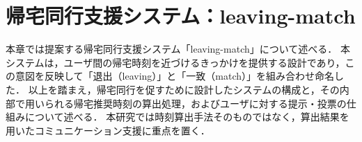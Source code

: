\thispagestyle{myheadings}
\chapter{帰宅同行支援システム：leaving-match}
本章では提案する帰宅同行支援システム「leaving-match」について述べる．
本システムは，ユーザ間の帰宅時刻を近づけるきっかけを提供する設計であり，この意図を反映して「退出（leaving）」と「一致（match）」を組み合わせ命名した．
以上を踏まえ，帰宅同行を促すために設計したシステムの構成と，その内部で用いられる帰宅推奨時刻の算出処理，およびユーザに対する提示・投票の仕組みについて述べる．
本研究では時刻算出手法そのものではなく，算出結果を用いたコミュニケーション支援に重点を置く．
















